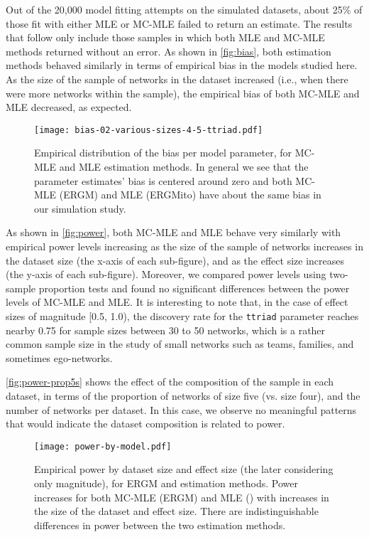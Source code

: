\documentclass[review]{elsarticle}
\begin{document}
Out of the 20,000 model fitting attempts on the simulated datasets, about 25\% of those fit with either MLE or MC-MLE failed to return an estimate. The results that follow only include those samples in which both MLE and MC-MLE methods returned without an error. As shown in \autoref{fig:bias}, both estimation methods behaved similarly in terms of empirical bias in the models studied here. As the size of the sample of networks in the dataset increased (i.e., when there were more networks within the sample), the empirical bias of both MC-MLE and MLE decreased, as expected.

\begin{figure}
	\centering
	\caption{\label{fig:bias}Empirical distribution of the bias per model parameter, for MC-MLE and MLE estimation methods. In general we see that the parameter estimates' bias is centered around zero and both MC-MLE (ERGM) and MLE (ERGMito) have about the same bias in our simulation study.}
	\texttt{[image: bias-02-various-sizes-4-5-ttriad.pdf]}
\end{figure}

As shown in \autoref{fig:power}, both MC-MLE and MLE behave very similarly with empirical power levels increasing as the size of the sample of networks increases in the dataset size (the x-axis of each sub-figure), and as the effect size increases (the y-axis of each sub-figure). Moreover, we compared power levels using two-sample proportion tests and found no significant differences between the power levels of MC-MLE and MLE. It is interesting to note that, in the case of effect sizes of magnitude [0.5, 1.0), the discovery rate for the \texttt{ttriad} parameter reaches nearby 0.75 for sample sizes between 30 to 50 networks, which is a rather common sample size in the study of small networks such as teams, families, and sometimes ego-networks. 

\autoref{fig:power-prop5s} shows the effect of the composition of the sample in each dataset, in terms of the proportion of networks of size five (vs. size four), and the number of networks per dataset. In this case, we observe no meaningful patterns that would indicate the dataset composition is related to power.

\begin{figure}[ht]
	\centering
	\caption{\label{fig:power}Empirical power by dataset size and effect size (the later considering only magnitude), for ERGM and \ergmito{} estimation methods. Power increases for both MC-MLE (ERGM) and MLE (\ergmito{}) with increases in the size of the dataset and effect size. There are indistinguishable differences in power between the two estimation methods.}
	\texttt{[image: power-by-model.pdf]}
\end{figure}
\end{document}
